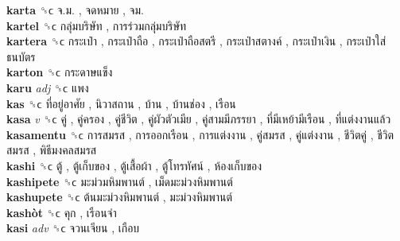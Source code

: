 \textbf{karta} ␝ϲ   จ.ม. ,  จดหมาย ,  จม.   \\
\textbf{kartel} ␝ϲ   กลุ่มบริษัท ,  การร่วมกลุ่มบริษัท   \\
\textbf{kartera} ␝ϲ   กระเป๋า ,  กระเป๋าถือ ,  กระเป๋าถือสตรี ,  กระเป๋าสตางค์ ,  กระเป๋าเงิน ,  กระเป๋าใส่ธนบัตร   \\
\textbf{karton} ␝ϲ   กระดาษแข็ง   \\
\textbf{karu} \emph{adj}  ␝ϲ   แพง   \\
\textbf{kas} ␝ϲ   ที่อยู่อาศัย ,  นิวาสถาน ,  บ้าน ,  บ้านช่อง ,  เรือน   \\
\textbf{kasa} \emph{v}  ␝ϲ   คู่ ,  คู่ครอง ,  คู่ชีวิต ,  คู่ผัวตัวเมีย ,  คู่สามมีภรรยา ,  ที่มีเหย้ามีเรือน ,  ที่แต่งงานแล้ว   \\
\textbf{kasamentu} ␝ϲ   การสมรส ,  การออกเรือน ,  การแต่งงาน ,  คู่สมรส ,  คู่แต่งงาน ,  ชีวิตคู่ ,  ชีวิตสมรส ,  พิธีมงคลสมรส   \\
\textbf{kashi} ␝ϲ   ตู้ ,  ตู้เก็บของ ,  ตู้เสื้อผ้า ,  ตู้โทรทัศน์ ,  ห้องเก็บของ   \\
\textbf{kashipete} ␝ϲ   มะม่วมหิมพานต์ ,  เม็ดมะม่วงหิมพานต์   \\
\textbf{kashupete} ␝ϲ   ต้นมะม่วงหิมพานต์ ,  มะม่วงหิมพานต์   \\
\textbf{kashòt} ␝ϲ   คุก ,  เรือนจำ   \\
\textbf{kasi} \emph{adv}  ␝ϲ   จวนเจียน ,  เกือบ   \\
